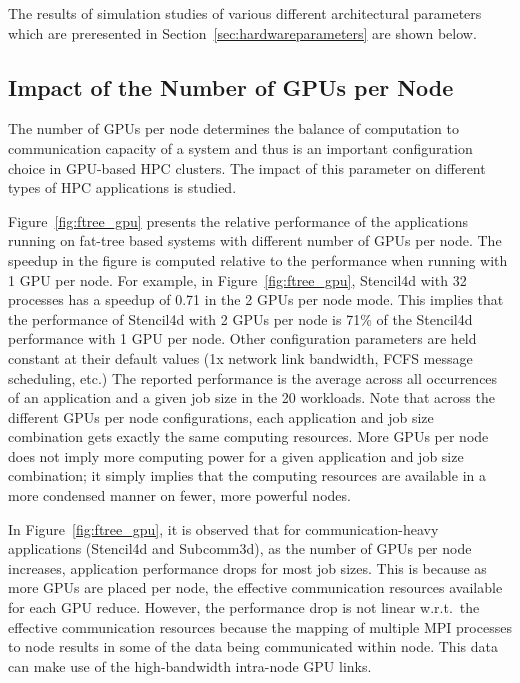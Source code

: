 
The results of simulation studies of various
different architectural parameters which are preresented in
Section~\ref{sec:hardwareparameters} are shown below.

\subsection{Impact of the Number of GPUs per Node}

The number of GPUs per node determines the balance of computation 
to communication capacity of a system and thus is an important configuration
choice in GPU-based HPC clusters.
The impact of this parameter on different types of HPC applications is studied.

Figure~\ref{fig:ftree_gpu} presents the relative performance of the applications
running on fat-tree based systems with different number of GPUs per node.  The
speedup in the figure is computed relative to the performance when running with 1 GPU per node.
For example, in Figure~\ref{fig:ftree_gpu}, Stencil4d with 32 processes has a
speedup of 0.71 in the 2 GPUs per node mode. This implies that the performance
of Stencil4d with 2 GPUs per node is 71\% of the Stencil4d performance with 1 GPU
per node.  Other configuration parameters are held constant at their default
values (1x network link bandwidth, FCFS message scheduling, etc.) The
reported performance is the average across all occurrences of an application
and a given job size in the 20 workloads. Note that across the different GPUs per node
configurations, each application and job size combination gets exactly the same computing
resources. More GPUs per node does not imply more computing power for a given
application and job size combination; it simply implies that the computing resources are
available in a more condensed manner on fewer, more powerful nodes.

In Figure~\ref{fig:ftree_gpu}, it is observed that for communication-heavy
applications (Stencil4d and Subcomm3d), as the number of GPUs per node
increases, application performance drops for most job sizes. This is because
as more GPUs are placed per node, the effective communication resources
available for each GPU reduce. However, the performance drop is not linear
w.r.t.~the effective communication resources because the mapping of multiple
MPI processes to node results in some of the data being communicated within
node. This data can make use of the high-bandwidth intra-node GPU links.

